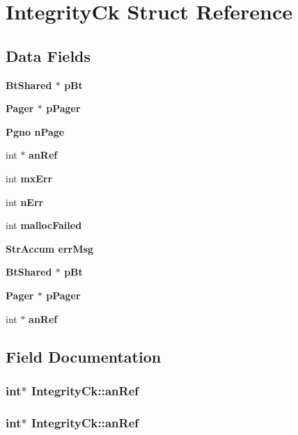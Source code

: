 \section{Integrity\-Ck Struct Reference}
\label{structIntegrityCk}
\subsection*{Data Fields}
\begin{CompactItemize}
\item 
\bf{Bt\-Shared} $\ast$ \bf{p\-Bt}
\item 
\bf{Pager} $\ast$ \bf{p\-Pager}
\item 
\bf{Pgno} \bf{n\-Page}
\item 
int $\ast$ \bf{an\-Ref}
\item 
int \bf{mx\-Err}
\item 
int \bf{n\-Err}
\item 
int \bf{malloc\-Failed}
\item 
\bf{Str\-Accum} \bf{err\-Msg}
\item 
\bf{Bt\-Shared} $\ast$ \bf{p\-Bt}
\item 
\bf{Pager} $\ast$ \bf{p\-Pager}
\item 
int $\ast$ \bf{an\-Ref}
\end{CompactItemize}


\subsection{Field Documentation}
\subsubsection{\setlength{\rightskip}{0pt plus 5cm}int$\ast$ \bf{Integrity\-Ck::an\-Ref}}\label{structIntegrityCk_af4c7e51e4afccc45e5a29eebaf5eaef}


\subsubsection{\setlength{\rightskip}{0pt plus 5cm}int$\ast$ \bf{Integrity\-Ck::an\-Ref}}\label{structIntegrityCk_af4c7e51e4afccc45e5a29eebaf5eaef}



